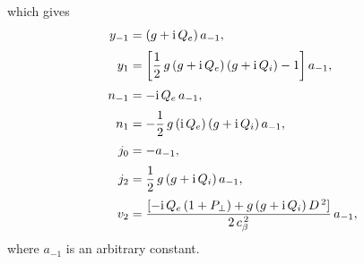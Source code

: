 \documentclass[12pt,prb,aps,notitlepage]{revtex4-1}
\begin{document}
which gives
\begin{align}
y_{-1} &= (g+{\rm i}\,Q_e)\,a_{-1},\label{ym1}\\[0.5ex]
y_1 &=\left[\frac{1}{2}\,g\,(g+{\rm i}\,Q_e)\,(g+{\rm i}\,Q_i) - 1\right]a_{-1},\\[0.5ex]
n_{-1}&= -{\rm i}\,Q_e\,a_{-1},\label{nm1}\\[0.5ex]
n_1&= - \frac{1}{2}\,g\,({\rm i}\,Q_e)\,(g+{\rm i}\,Q_i)\,a_{-1},\\[0.5ex]
j_0 &= -a_{-1},\\[0.5ex]
j_2&= \frac{1}{2}\,g\,(g+{\rm i}\,Q_i)\,a_{-1},\\[0.5ex]
v_2 &= \frac{[-{\rm i}\,Q_e\,(1+P_\perp) + g\,(g+{\rm i}\,Q_i)\,D^{\,2}]}{2\,c_\beta^{\,2}}\,a_{-1},
\end{align}
where $a_{-1}$ is an arbitrary constant. 
\end{document}
